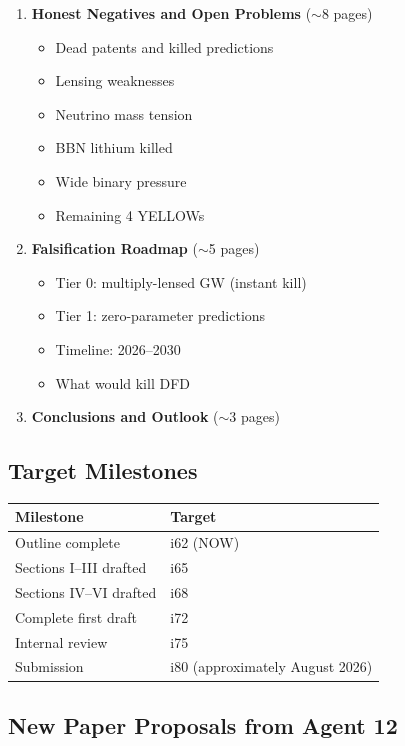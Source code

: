\documentclass[11pt,a4paper]{article}
\begin{document}
\begin{enumerate}[label=\Roman*.]
\item \textbf{Honest Negatives and Open Problems} ($\sim$8 pages)
\begin{itemize}
\item Dead patents and killed predictions
\item Lensing weaknesses
\item Neutrino mass tension
\item BBN lithium killed
\item Wide binary pressure
\item Remaining 4 YELLOWs
\end{itemize}

\item \textbf{Falsification Roadmap} ($\sim$5 pages)
\begin{itemize}
\item Tier 0: multiply-lensed GW (instant kill)
\item Tier 1: zero-parameter predictions
\item Timeline: 2026--2030
\item What would kill DFD
\end{itemize}

\item \textbf{Conclusions and Outlook} ($\sim$3 pages)
\end{enumerate}

\subsection{Target Milestones}

\begin{center}
\begin{tabular}{ll}
\toprule
\textbf{Milestone} & \textbf{Target} \\
\midrule
Outline complete & i62 (NOW) \\
Sections I--III drafted & i65 \\
Sections IV--VI drafted & i68 \\
Complete first draft & i72 \\
Internal review & i75 \\
Submission & i80 (approximately August 2026) \\
\bottomrule
\end{tabular}
\end{center}

\subsection{New Paper Proposals from Agent 12}
\end{document}
